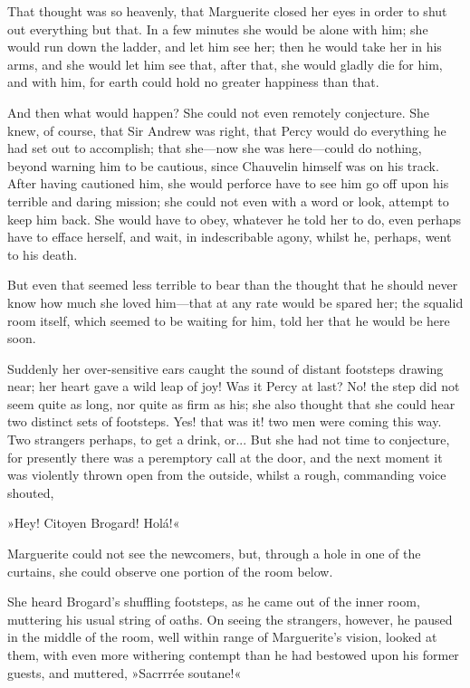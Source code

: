 That thought was so heavenly, that Marguerite closed her eyes in order to shut out everything but that. In a few minutes she would be alone with him; she would run down the ladder, and let him see her; then he would take her in his arms, and she would let him see that, after that, she would gladly die for him, and with him, for earth could hold no greater happiness than that.

And then what would happen? She could not even remotely conjecture. She knew, of course, that Sir Andrew was right, that Percy would do everything he had set out to accomplish; that she\allowbreak---\allowbreak now she was here\allowbreak---\allowbreak could do nothing, beyond warning him to be cautious, since Chauvelin himself was on his track. After having cautioned him, she would perforce have to see him go off upon his terrible and daring mission; she could not even with a word or look, attempt to keep him back. She would have to obey, whatever he told her to do, even perhaps have to efface herself, and wait, in indescribable agony, whilst he, perhaps, went to his death.

But even that seemed less terrible to bear than the thought that he should never know how much she loved him\allowbreak---\allowbreak that at any rate would be spared her; the squalid room itself, which seemed to be waiting for him, told her that he would be here soon.

Suddenly her over-sensitive ears caught the sound of distant footsteps drawing near; her heart gave a wild leap of joy! Was it Percy at last? No! the step did not seem quite as long, nor quite as firm as his; she also thought that she could hear two distinct sets of footsteps. Yes! that was it! two men were coming this way. Two strangers perhaps, to get a drink, or... But she had not time to conjecture, for presently there was a peremptory call at the door, and the next moment it was violently thrown open from the outside, whilst a rough, commanding voice shouted,\longdash


»Hey! Citoyen Brogard! Holá!«

Marguerite could not see the newcomers, but, through a hole in one of the curtains, she could observe one portion of the room below.

She heard Brogard's shuffling footsteps, as he came out of the inner room, muttering his usual string of oaths. On seeing the strangers, however, he paused in the middle of the room, well within range of Marguerite's vision, looked at them, with even more withering contempt than he had bestowed upon his former guests, and muttered, »Sacrrrée soutane!«

